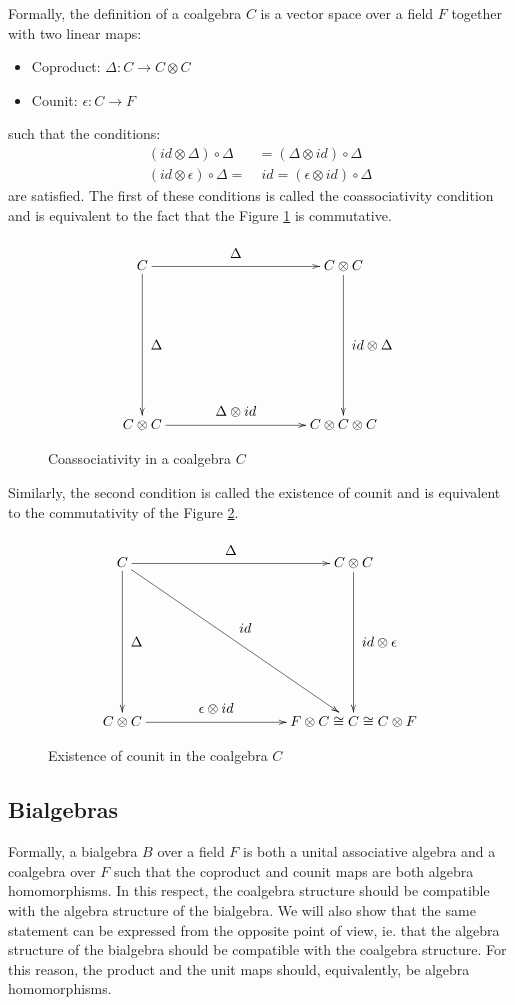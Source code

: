 Formally, the definition of a coalgebra $C$ is a vector space over a field $F$ together with
two linear maps:
\begin{itemize}
    \item Coproduct: $\Delta: C \rightarrow C \otimes C$
    \item Counit: $\epsilon: C \rightarrow F$
\end{itemize}
such that the conditions:
\begin{align}
(id \otimes \Delta) \circ \Delta & = (\Delta \otimes id) \circ \Delta \\
(id \otimes \epsilon) \circ \Delta = &\; id = (\epsilon \otimes id) \circ \Delta
\end{align}
are satisfied. The first of these conditions is called the coassociativity condition and is
equivalent to the fact that the Figure \ref{coassoc-coalgebra} is commutative.
\begin{figure}[!h]
  \[
  \xymatrix@=100pt{
    C \ar[r]^-*+{\Delta} \ar[d]^-*+{\Delta}& C \otimes C \ar[d]^-*+{id \otimes \Delta}\\
    C \otimes C \ar[r]^-*+{\Delta \otimes id} & C \otimes C \otimes C \\
  }
  \]
  \caption{Coassociativity in a coalgebra $C$}
  \label{coassoc-coalgebra}
\end{figure}
Similarly, the second condition is called the existence of counit and is equivalent to the
commutativity of the Figure \ref{counit-coalgebra}.
\begin{figure}[!h]
  \[
  \xymatrix@=100pt{
    C
       \ar[r]^-*+{\Delta}
       \ar[d]^-*+{\Delta}
       \ar[dr]^-*+{id} & C \otimes C \ar[d]^-*+{id \otimes \epsilon}\\
    C \otimes C \ar[r]^-*+{\epsilon \otimes id} & F \otimes C \cong C \cong C \otimes F \\
  }
  \]
  \caption{Existence of counit in the coalgebra $C$}
  \label{counit-coalgebra}
\end{figure}


\subsection{Bialgebras}


Formally, a bialgebra $B$  over a field $F$ is both a unital associative algebra
and a coalgebra over $F$ such that the coproduct and counit maps are both algebra homomorphisms.
In this respect, the coalgebra structure should be compatible with the algebra structure
of the bialgebra. We will also show that the same statement can be expressed from the
opposite point of view, ie. that the algebra structure of the bialgebra should be
compatible with the coalgebra structure. For this reason, the product and the unit maps
should, equivalently, be algebra homomorphisms.


